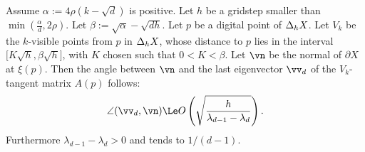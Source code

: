 \begin{theorem}
    \label{thm-angle-convergence}
    Assume $\alpha:=4\rho(k-\sqrt{d})$ is positive. Let $h$ be a
    gridstep smaller than $\min(\frac{\alpha}{d}, 2\rho)$. Let
    $\beta:=\sqrt{\alpha}-\sqrt{dh}$. Let $p$ be a digital point of
    $\Delta_{h} {X}$. Let $V_k$ be the $k$-visible points from $p$ in
    $\Delta_{h} {X}$, whose distance to $p$ lies in the interval $\lbrack
    K \sqrt{h}, \beta \sqrt{h} \rbrack$, with $K$ chosen such that
    $0< K< \beta$. Let $\vn$ be the normal of $\partial X$ at
    $\xi(p)$. Then the angle between $\vn$ and the last
    eigenvector $\vv_d$ of the $V_k$-tangent matrix $A(p)$ follows:
    \begin{align}
        \label{eq-alpha-upper-bound}
        \angle (\vv_d, \vn) \Le O\left(\sqrt{\frac{h}{\lambda_{d-1} - \lambda_d}}\right).
    \end{align}
    Furthermore $\lambda_{d-1} - \lambda_d >0$ and tends to $1/(d-1)$.
\end{theorem}
